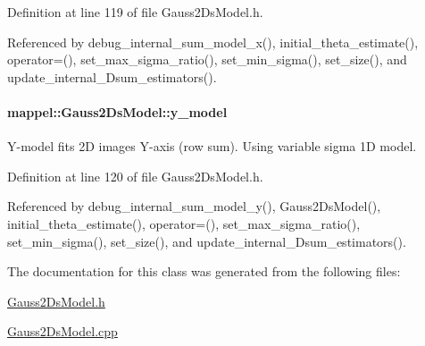 Definition at line 119 of file Gauss2\+Ds\+Model.\+h.



Referenced by debug\+\_\+internal\+\_\+sum\+\_\+model\+\_\+x(), initial\+\_\+theta\+\_\+estimate(), operator=(), set\+\_\+max\+\_\+sigma\+\_\+ratio(), set\+\_\+min\+\_\+sigma(), set\+\_\+size(), and update\+\_\+internal\+\_\+Dsum\+\_\+estimators().

\paragraph[{\texorpdfstring{y\+\_\+model}{y_model}}]{ mappel\+::\+Gauss2\+Ds\+Model\+::y\+\_\+model\hspace{0.3cm}{\ttfamily [protected]}}\hypertarget{classmappel_1_1Gauss2DsModel_a6efbb695d2f2285ac1a2f7cff7f67a07}{}\label{classmappel_1_1Gauss2DsModel_a6efbb695d2f2285ac1a2f7cff7f67a07}
Y-\/model fits 2D images Y-\/axis (row sum). Using variable sigma 1D model. 

Definition at line 120 of file Gauss2\+Ds\+Model.\+h.



Referenced by debug\+\_\+internal\+\_\+sum\+\_\+model\+\_\+y(), Gauss2\+Ds\+Model(), initial\+\_\+theta\+\_\+estimate(), operator=(), set\+\_\+max\+\_\+sigma\+\_\+ratio(), set\+\_\+min\+\_\+sigma(), set\+\_\+size(), and update\+\_\+internal\+\_\+Dsum\+\_\+estimators().



The documentation for this class was generated from the following files\+:\begin{DoxyCompactItemize}
\item 
\hyperlink{Gauss2DsModel_8h}{Gauss2\+Ds\+Model.\+h}\item 
\hyperlink{Gauss2DsModel_8cpp}{Gauss2\+Ds\+Model.\+cpp}\end{DoxyCompactItemize}
